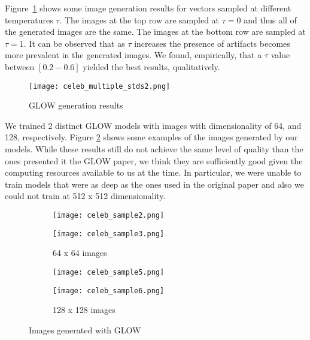 Figure~\ref{fig:glow_results} shows some image generation results for vectors sampled at different temperatures $\tau$. The images at the top row are sampled at $\tau = 0$ and thus all of the generated images are the same. The images at the bottom row are sampled at $\tau = 1$. It can be observed that as $\tau$ increases the presence of artifacts becomes more prevalent in the generated images. We found, empirically, that a $\tau$ value between $[0.2-0.6]$ yielded the best results, qualitatively.
    \begin{figure}
        \centering
        \texttt{[image: celeb\_multiple\_stds2.png]}
        \caption{GLOW generation results}
        \label{fig:glow_results}
    \end{figure}

We trained 2 distinct GLOW models with images with dimensionality of 64, and 128, respectively. Figure \ref{fig:glow_results2} shows some examples of the images generated by our models. While these results still do not achieve the same level of quality than the ones presented it the GLOW paper, we think they are sufficiently good given the computing resources available to us at the time. In particular, we were unable to train models that were as deep as the ones used in the original paper and also we could not train at 512 x 512 dimensionality.    

    \begin{figure}[htbp!]
     \centering
     \begin{subfigure}[b]{0.3\textwidth}
         \centering
         \texttt{[image: celeb\_sample2.png]}
     \end{subfigure}
     \hfill
     \begin{subfigure}[b]{0.3\textwidth}
         \centering
         \texttt{[image: celeb\_sample3.png]}
         \caption{64 x 64 images}
     \end{subfigure}
     \hfill
     \begin{subfigure}[b]{0.3\textwidth}
         \centering
         \texttt{[image: celeb\_sample5.png]}
     \end{subfigure}
     \hfill
     \begin{subfigure}[b]{0.3\textwidth}
         \centering
         \texttt{[image: celeb\_sample6.png]}
         \caption{128 x 128 images}
     \end{subfigure}
     \hfill

     \caption{Images generated with GLOW}
     \label{fig:glow_results2}
\end{figure}

